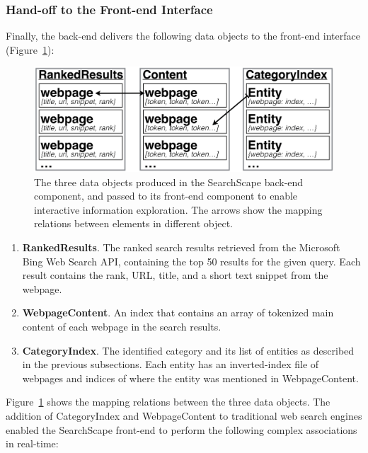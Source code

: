 \subsubsection{Hand-off to the Front-end Interface}


Finally, the back-end delivers the following data objects to the front-end interface (Figure~\ref{fig:ds}):

\begin{figure}
    \centering
    \includegraphics[width=0.5\columnwidth]{Chapters/SearchScape/figures/ds.png}
    \caption[The three data objects produced in the SearchScape back-end component.]{The three data objects produced in the SearchScape back-end component, and passed to its front-end component to enable interactive information exploration. The arrows show the mapping relations between elements in different object.}
    \label{fig:ds}
\end{figure}


\begin{enumerate}
   
    \item \textbf{RankedResults}. The ranked search results retrieved from the Microsoft Bing Web Search API, containing the top 50 results for the given query. Each result contains the rank, URL, title, and a short text snippet from the webpage. 
    
    \item \textbf{WebpageContent}. An index that contains an array of tokenized main content of each webpage in the search results.
    
    \item \textbf{CategoryIndex}. The identified category and its list of entities as described in the previous subsections. Each entity has an inverted-index file\cite{baeza1999modern} of webpages and indices of where the entity was mentioned in WebpageContent. 
\end{enumerate}

Figure~\ref{fig:ds} shows the mapping relations between the three data objects. The addition of CategoryIndex and WebpageContent to traditional web search engines enabled the SearchScape front-end to perform the following complex associations in real-time: 


